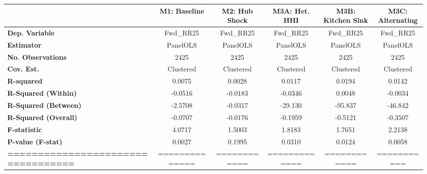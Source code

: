 \begin{center}
\begin{tabular}{lccccc}
\toprule
                                              & \textbf{M1: Baseline} & \textbf{M2: Hub Shock} & \textbf{M3A: Het. HHI} & \textbf{M3B: Kitchen Sink} & \textbf{M3C: Alternating}  \\
\midrule
\textbf{Dep. Variable}                        &       Fwd\_RR25       &       Fwd\_RR25        &       Fwd\_RR25        &         Fwd\_RR25          &         Fwd\_RR25          \\
\textbf{Estimator}                            &        PanelOLS       &        PanelOLS        &        PanelOLS        &          PanelOLS          &          PanelOLS          \\
\textbf{No. Observations}                     &          2425         &          2425          &          2425          &            2425            &            2425            \\
\textbf{Cov. Est.}                            &       Clustered       &       Clustered        &       Clustered        &         Clustered          &         Clustered          \\
\textbf{R-squared}                            &         0.0075        &         0.0028         &         0.0117         &           0.0194           &           0.0142           \\
\textbf{R-Squared (Within)}                   &        -0.0516        &        -0.0183         &        -0.0346         &           0.0048           &          -0.0034           \\
\textbf{R-Squared (Between)}                  &        -2.5708        &        -0.0317         &        -29.130         &          -95.837           &          -46.842           \\
\textbf{R-Squared (Overall)}                  &        -0.0707        &        -0.0176         &        -0.1959         &          -0.5121           &          -0.3507           \\
\textbf{F-statistic}                          &         4.0717        &         1.5003         &         1.8183         &           1.7651           &           2.2138           \\
\textbf{P-value (F-stat)}                     &         0.0027        &         0.1995         &         0.0310         &           0.0124           &           0.0058           \\
\textbf{==================================}   &     ==============    &      ============      &     =============      &        ============        &        ===========         \\

\end{tabular}
\end{center}
